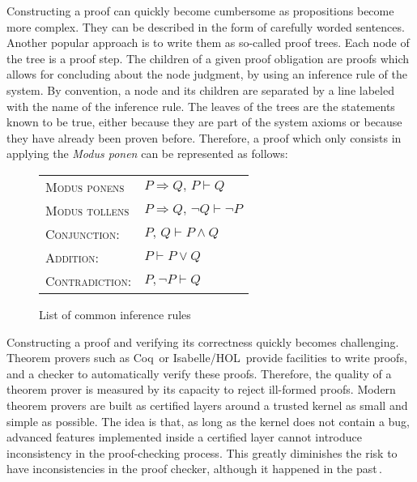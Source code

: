 Constructing a proof can quickly become cumbersome as propositions become more
complex.
%
They can be described in the form of carefully worded sentences.
%
Another popular approach is to write them as so-called proof trees.
%
Each node of the tree is a proof step.
%
The children of a given proof obligation are proofs which allows for concluding
about the node judgment, by using an inference rule of the system.
%
By convention, a node and its children are separated by a line labeled with the
name of the inference rule.
%
The leaves of the trees are the statements known to be true, either because they
are part of the system axioms or because they have already been proven before.
%
Therefore, a proof which only consists in applying the \emph{Modus ponen} can be
represented as follows:
%
\begin{prooftree}
     
\end{prooftree}

\begin{figure}
  \begin{center}
    \begin{tabular}{ll}
      {\scshape Modus ponens} & \( P \Rightarrow Q\text{, }P \vdash Q \) \\
      {\scshape Modus tollens} &
                                 \( P \Rightarrow Q\text{, }\neg Q \vdash \neg P \) \\
      {\scshape Conjunction:} & \( P\text{, }Q \vdash P \wedge Q \) \\
      {\scshape Addition:} & \( P \vdash P \vee Q \) \\
      {\scshape Contradiction:} & \( P, \neg P \vdash Q \)
    \end{tabular}
  \end{center}

  \caption{List of common inference rules}
  \label{fig:sota:inference}
\end{figure}

Constructing a proof and verifying its correctness quickly becomes challenging.
%
Theorem provers such as Coq\,\cite{coq} or
Isabelle/HOL\,\cite{nipkow2002isabelle} provide facilities to write proofs, and
a checker to automatically verify these proofs.
%
Therefore, the quality of a theorem prover is measured by its capacity to reject
ill-formed proofs.
%
Modern theorem provers are built as certified layers around a trusted kernel as
small and simple as possible.
%
The idea is that, as long as the kernel does not contain a bug, advanced
features implemented inside a certified layer cannot introduce inconsistency in
the proof-checking process.
%
This greatly diminishes the risk to have inconsistencies in the proof checker,
although it happened in the
past\,\cite{claret2015falso,griffioen1998comparison}.

